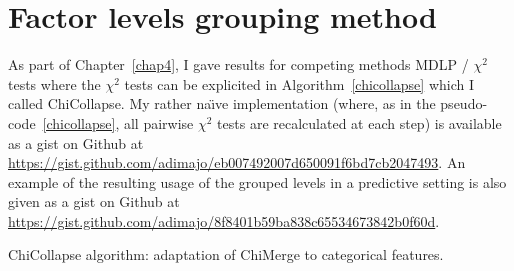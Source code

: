

\section{Factor levels grouping method} \label{app1:chicollapse}

As part of Chapter~\ref{chap4}, I gave results for competing methods MDLP / $\chi^2$ tests where the $\chi^2$ tests can be explicited in Algorithm~\ref{chicollapse} which I called ChiCollapse. My rather na{\"\i}ve implementation (where, as in the pseudo-code~\ref{chicollapse}, all pairwise $\chi^2$ tests are recalculated at each step) is available as a gist on Github at \url{https://gist.github.com/adimajo/eb007492007d650091f6bd7cb2047493}. An example of the resulting usage of the grouped levels in a predictive setting is also given as a gist on Github at \url{https://gist.github.com/adimajo/8f8401b59ba838c65534673842b0f60d}.

\begin{algorithm}[H]
 \KwResult{$\hat{\q}$}
 \caption{\label{chicollapse} ChiCollapse algorithm: adaptation of ChiMerge to categorical features.}
\end{algorithm}





